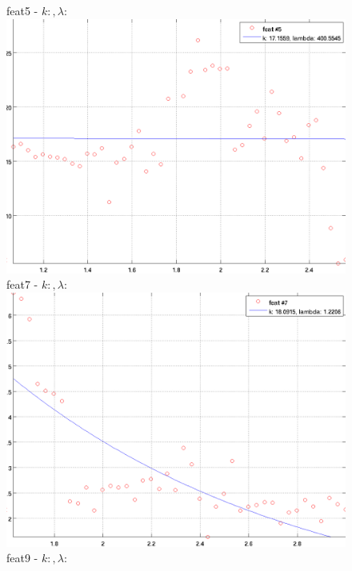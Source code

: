 \documentclass[12pt]{report}
\begin{document}
\begin{figure}[H]
\begin{minipage}[t]{0.5\linewidth}
	\centering
	feat5 - $k: , \lambda:  $\\
	\includegraphics[scale=\imFeat]{images/feat5}\\
	feat7 - $k: , \lambda:  $\\
	\includegraphics[scale=\imFeat]{images/feat7}\\
	feat9 - $k: , \lambda:  $\\

\end{minipage}
\end{figure}
\end{document}
